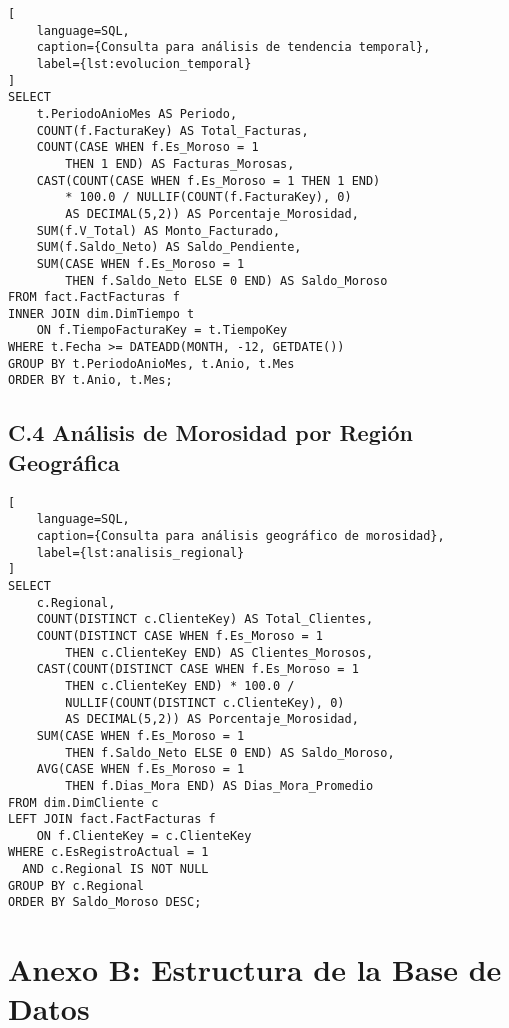 \begin{lstlisting}[
    language=SQL,
    caption={Consulta para análisis de tendencia temporal},
    label={lst:evolucion_temporal}
]
SELECT 
    t.PeriodoAnioMes AS Periodo,
    COUNT(f.FacturaKey) AS Total_Facturas,
    COUNT(CASE WHEN f.Es_Moroso = 1 
        THEN 1 END) AS Facturas_Morosas,
    CAST(COUNT(CASE WHEN f.Es_Moroso = 1 THEN 1 END) 
        * 100.0 / NULLIF(COUNT(f.FacturaKey), 0) 
        AS DECIMAL(5,2)) AS Porcentaje_Morosidad,
    SUM(f.V_Total) AS Monto_Facturado,
    SUM(f.Saldo_Neto) AS Saldo_Pendiente,
    SUM(CASE WHEN f.Es_Moroso = 1 
        THEN f.Saldo_Neto ELSE 0 END) AS Saldo_Moroso
FROM fact.FactFacturas f
INNER JOIN dim.DimTiempo t 
    ON f.TiempoFacturaKey = t.TiempoKey
WHERE t.Fecha >= DATEADD(MONTH, -12, GETDATE())
GROUP BY t.PeriodoAnioMes, t.Anio, t.Mes
ORDER BY t.Anio, t.Mes;
\end{lstlisting}

\subsection{C.4 Análisis de Morosidad por Región Geográfica}

\begin{lstlisting}[
    language=SQL,
    caption={Consulta para análisis geográfico de morosidad},
    label={lst:analisis_regional}
]
SELECT 
    c.Regional,
    COUNT(DISTINCT c.ClienteKey) AS Total_Clientes,
    COUNT(DISTINCT CASE WHEN f.Es_Moroso = 1 
        THEN c.ClienteKey END) AS Clientes_Morosos,
    CAST(COUNT(DISTINCT CASE WHEN f.Es_Moroso = 1 
        THEN c.ClienteKey END) * 100.0 / 
        NULLIF(COUNT(DISTINCT c.ClienteKey), 0) 
        AS DECIMAL(5,2)) AS Porcentaje_Morosidad,
    SUM(CASE WHEN f.Es_Moroso = 1 
        THEN f.Saldo_Neto ELSE 0 END) AS Saldo_Moroso,
    AVG(CASE WHEN f.Es_Moroso = 1 
        THEN f.Dias_Mora END) AS Dias_Mora_Promedio
FROM dim.DimCliente c
LEFT JOIN fact.FactFacturas f 
    ON f.ClienteKey = c.ClienteKey
WHERE c.EsRegistroActual = 1
  AND c.Regional IS NOT NULL
GROUP BY c.Regional
ORDER BY Saldo_Moroso DESC;
\end{lstlisting}


\section{Anexo B: Estructura de la Base de Datos}


